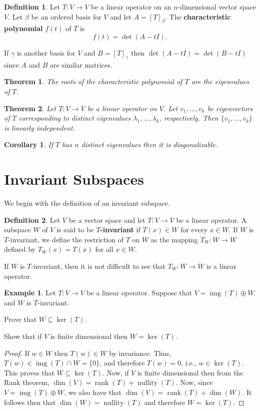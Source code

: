 \documentclass[12pt]{article}
\DeclareMathOperator{\rank}{rank}
\DeclareMathOperator{\rng}{img}
\DeclareMathOperator{\nullity}{nullity}
\newcommand{\tv}{T:V\rightarrow V}
\newtheorem{theorem}{Theorem}[section]
\newtheorem{corollary}{Corollary}[section]
\theoremstyle{definition}
\newtheorem{definition}{Definition}[section]
\newtheorem{example}{Example}[section]
\begin{document}
\begin{definition}
Let $\tv$ be a linear operator on an $n$-dimensional vector space $V$.  Let $\beta$ be an ordered basis for $V$ and let $A=[T]_\beta$.  The \textbf{characteristic polynomial} $f(t)$ of $T$ is
\[
f(t) = \det(A-tI).
\]
\end{definition}
If $\gamma$ is another basis for $V$ and $B=[T]_\gamma$ then $\det(A-tI) = \det(B-tI)$ since $A$ and $B$ are similar matrices.  

\begin{theorem}
The roots of the characteristic polynomial of $T$ are the eigenvalues of $T$.
\end{theorem}

\begin{theorem}
Let $\tv$ be a linear operator on $V$.  Let $v_1,\ldots,v_k$ be eigenvectors of $T$ corresponding to distinct eigenvalues $\lambda_1,\ldots,\lambda_k$, respectively.  Then $\{v_1,\ldots,v_k\}$ is linearly independent.
\end{theorem}

\begin{corollary}
If $T$ has $n$ distinct eigenvalues then it is diagonalizable.
\end{corollary}

\section{Invariant Subspaces}

We begin with the definition of an invariant subspace.
\begin{definition}
Let $V$ be a vector space and let $T:V\rightarrow V$ be a linear operator.  A subspace $W$ of $V$ is said to be $T$\textbf{-invariant} if $T(x)\in W$ for every $x\in W$.  If $W$ is $T$-invariant, we define the restriction of $T$ on $W$ as the mapping $T_W:W\rightarrow W$ defined by $T_W(x)=T(x)$ for all $x\in W$.
\end{definition}

If $W$ is $T$-invariant, then it is not difficult to see that $T_W:W\rightarrow W$ is a linear operator.  

\begin{example}
Let $T:V\rightarrow V$ be a linear operator.  Suppose that $V=\rng(T)\oplus W$ and $W$ is $T$-invariant.  
\begin{compactenum}[(a)]
\item Prove that $W\subseteq \ker(T)$.
\item Show that if $V$ is finite dimensional then $W=\ker(T)$.
\end{compactenum}
\end{example}
\begin{proof}
If $w\in W$ then $T(w)\in W$ by invariance.  Thus, $T(w) \in \rng(T)\cap W = \{0\}$, and therefore $T(w)=0$, i.e., $w\in \ker(T)$.  This proves that $W\subseteq \ker(T)$.  Now, if $V$ is finite dimensional then from the Rank theorem, $\dim(V) = \rank(T) + \nullity(T)$.  Now, since $V=\rng(T)\oplus W$, we also have that $\dim(V) = \rank(T) + \dim(W)$.  It follows then that $\dim(W) = \nullity(T)$ and therefore $W = \ker(T)$.
\end{proof}
\end{document}
